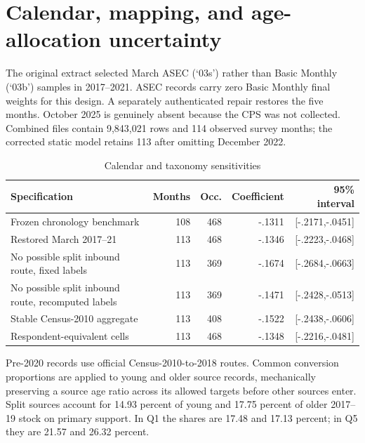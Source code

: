 \section{Calendar, mapping, and age-allocation uncertainty}\label{app:mapping}

The original extract selected March ASEC (`03s') rather than Basic Monthly (`03b') samples in 2017--2021. ASEC records carry zero Basic Monthly final weights for this design. A separately authenticated repair restores the five months. October 2025 is genuinely absent because the CPS was not collected. Combined files contain 9,843,021 rows and 114 observed survey months; the corrected static model retains 113 after omitting December 2022.

\begin{table}[htbp]
\centering
\caption{Calendar and taxonomy sensitivities}\label{tab:appcalendar}
\small
\begin{tabularx}{\textwidth}{Yrrrr}
\toprule
Specification & Months & Occ. & Coefficient & 95\% interval \\
\midrule
Frozen chronology benchmark & 108 & 468 & -.1311 & [-.2171,-.0451] \\
Restored March 2017--21 & 113 & 468 & -.1346 & [-.2223,-.0468] \\
No possible split inbound route, fixed labels & 113 & 369 & -.1674 & [-.2684,-.0663] \\
No possible split inbound route, recomputed labels & 113 & 369 & -.1471 & [-.2428,-.0513] \\
Stable Census-2010 aggregate & 113 & 408 & -.1522 & [-.2438,-.0606] \\
Respondent-equivalent cells & 113 & 468 & -.1348 & [-.2216,-.0481] \\
\bottomrule
\end{tabularx}
\end{table}



Pre-2020 records use official Census-2010-to-2018 routes. Common conversion proportions are applied to young and older source records, mechanically preserving a source age ratio across its allowed targets before other sources enter. Split sources account for 14.93 percent of young and 17.75 percent of older 2017--19 stock on primary support. In Q1 the shares are 17.48 and 17.13 percent; in Q5 they are 21.57 and 26.32 percent.

